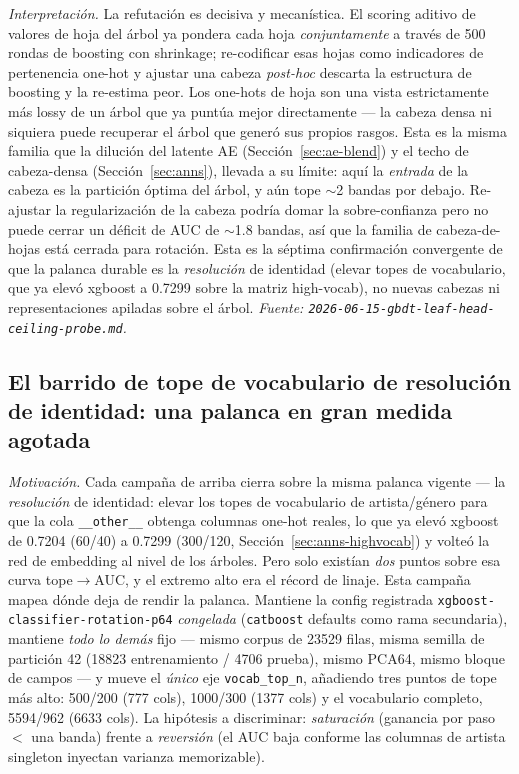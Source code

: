 \documentclass[11pt]{article}
\begin{document}
\emph{Interpretación.} La refutación es decisiva y mecanística. El scoring aditivo
de valores de hoja del árbol ya pondera cada hoja \emph{conjuntamente} a través de
500 rondas de boosting con shrinkage; re-codificar esas hojas como indicadores de
pertenencia one-hot y ajustar una cabeza \emph{post-hoc} descarta la estructura de
boosting y la re-estima peor. Los one-hots de hoja son una vista estrictamente más
lossy de un árbol que ya puntúa mejor directamente --- la cabeza densa ni siquiera
puede recuperar el árbol que generó sus propios rasgos. Esta es la misma familia
que la dilución del latente AE (Sección~\ref{sec:ae-blend}) y el techo de
cabeza-densa (Sección~\ref{sec:anns}), llevada a su límite: aquí la \emph{entrada}
de la cabeza es la partición óptima del árbol, y aún tope $\sim$2 bandas por
debajo. Re-ajustar la regularización de la cabeza podría domar la sobre-confianza
pero no puede cerrar un déficit de AUC de $\sim$1.8 bandas, así que la familia de
cabeza-de-hojas está cerrada para rotación. Esta es la séptima confirmación
convergente de que la palanca durable es la \emph{resolución} de identidad
(elevar topes de vocabulario, que ya elevó xgboost a \num{0.7299} sobre la matriz
high-vocab), no nuevas cabezas ni representaciones apiladas sobre el árbol.
\emph{Fuente: \texttt{2026-06-15-gbdt-leaf-head-ceiling-probe.md}.}

\subsection{El barrido de tope de vocabulario de resolución de identidad: una palanca en gran medida agotada}
\label{sec:vocab-cap}
\emph{Motivación.} Cada campaña de arriba cierra sobre la misma palanca vigente
--- la \emph{resolución} de identidad: elevar los topes de vocabulario de
artista/género para que la cola \texttt{\_\_other\_\_} obtenga columnas one-hot
reales, lo que ya elevó xgboost de \num{0.7204} (60/40) a \num{0.7299} (300/120,
Sección~\ref{sec:anns-highvocab}) y volteó la red de embedding al nivel de los
árboles. Pero solo existían \emph{dos} puntos sobre esa curva tope$\to$AUC, y el
extremo alto era el récord de linaje. Esta campaña mapea dónde deja de rendir la
palanca. Mantiene la config registrada
\texttt{xgboost-classifier-rotation-p64} \emph{congelada} (\texttt{catboost}
defaults como rama secundaria), mantiene \emph{todo lo demás} fijo --- mismo
corpus de \num{23529} filas, misma semilla de partición 42 (\num{18823}
entrenamiento / \num{4706} prueba), mismo PCA64, mismo bloque de campos --- y mueve
el \emph{único} eje \texttt{vocab\_top\_n}, añadiendo tres puntos de tope más alto:
500/200 (777 cols), 1000/300 (1377 cols) y el vocabulario completo, 5594/962 (6633
cols). La hipótesis a discriminar: \emph{saturación} (ganancia por paso $<$ una
banda) frente a \emph{reversión} (el AUC baja conforme las columnas de artista
singleton inyectan varianza memorizable).
\end{document}
